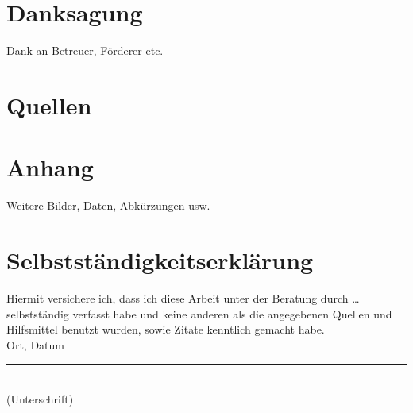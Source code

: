 \documentclass[12pt,a4paper]{article}
\newcommand{\bib}{}
\begin{document}
	\section*{Danksagung}
	Dank an Betreuer, Förderer etc.
	
	\section*{Quellen}
	\bib
	
	\appendix
	\section{Anhang}
	Weitere Bilder, Daten, Abkürzungen usw.
	
	\section*{Selbstständigkeitserklärung}
	Hiermit versichere ich, dass ich diese Arbeit unter der Beratung durch … selbstständig verfasst habe und keine anderen als die angegebenen Quellen und Hilfsmittel benutzt wurden, sowie Zitate kenntlich gemacht habe. \\[2cm]
	
	Ort, Datum \hfill \rule{5cm}{0.4pt} \\
	\hfill (Unterschrift)
	
\end{document}
